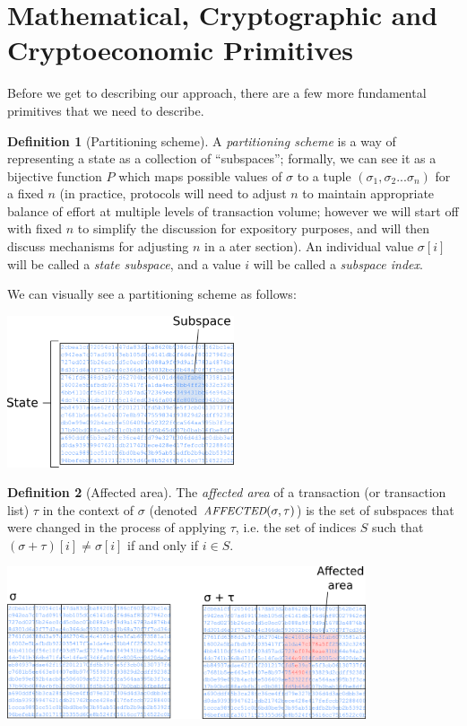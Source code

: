 \documentclass[11pt,a4paper]{article}
\makeatletter
\theoremstyle{plain}
\theoremstyle{definition}
\newtheorem{defn}{Definition}[section]
\theoremstyle{remark}
\newcommand{\ie}{i.e.\@\xspace}
\newcommand{\makeintoafunction}[1]{\textit{\uppercase{\small #1}}}
\newcommand{\AFFECTED}{\makeintoafunction{affected}}
\makeatother
\begin{document}
\section{Mathematical, Cryptographic and Cryptoeconomic Primitives}

Before we get to describing our approach, there are a few more fundamental primitives that we need to describe.

\begin{defn}[Partitioning scheme]
A \emph{partitioning scheme} is a way of representing a state as a collection of ``subspaces''; formally, we can see it as a bijective function $P$ which maps possible values of $\sigma$ to a tuple $(\sigma_1, \sigma_2 ... \sigma_n)$ for a fixed $n$ (in practice, protocols will need to adjust $n$ to maintain appropriate balance of effort at multiple levels of transaction volume; however we will start off with fixed $n$ to simplify the discussion for expository purposes, and will then discuss mechanisms for adjusting $n$ in a ater section). An individual value $\sigma[i]$ will be called a \emph{state subspace}, and a value $i$ will be called a \emph{subspace index}.
\end{defn}

We can visually see a partitioning scheme as follows:

\begin{center}
\includegraphics[width=190pt]{subspace2.png}
\end{center}

\begin{defn}[Affected area]
The \emph{affected area} of a transaction (or transaction list) $\tau$ in the context of $\sigma$ (denoted $\AFFECTED(\sigma, \tau)$) is the set of subspaces that were changed in the process of applying $\tau$, \ie the set of indices $S$ such that $(\sigma + \tau)[i] \ne \sigma[i]$ if and only if $i \in S$.
\end{defn}

\begin{center}
\includegraphics[width=300pt]{subspace1.png}
\end{center}
\end{document}
